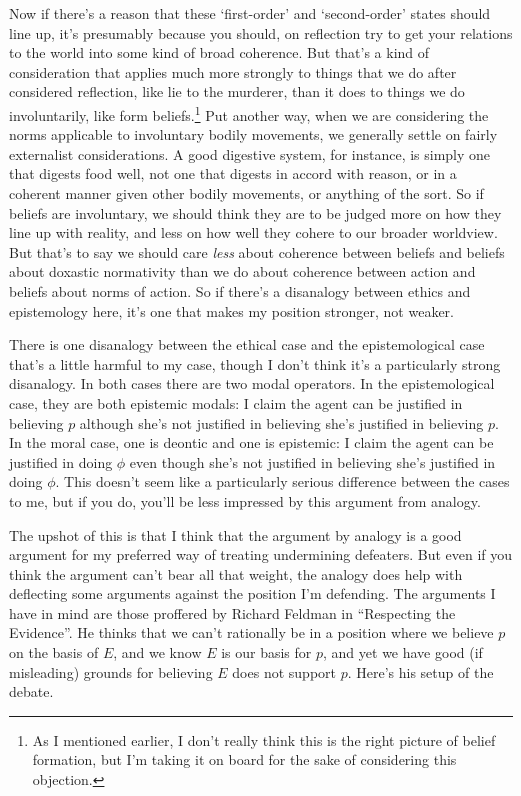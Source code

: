 Now if there's a reason that these `first-order' and `second-order' states should line up, it's presumably because you should, on reflection try to get your relations to the world into some kind of broad coherence. But that's a kind of consideration that applies much more strongly to things that we do after considered reflection, like lie to the murderer, than it does to things we do involuntarily, like form beliefs.\footnote{As I mentioned earlier, I don't really think this is the right picture of belief formation, but I'm taking it on board for the sake of considering this objection.} Put another way, when we are considering the norms applicable to involuntary bodily movements, we generally settle on fairly externalist considerations. A good digestive system, for instance, is simply one that digests food well, not one that digests in accord with reason, or in a coherent manner given other bodily movements, or anything of the sort. So if beliefs are involuntary, we should think they are to be judged more on how they line up with reality, and less on how well they cohere to our broader worldview. But that's to say we should care \textit{less} about coherence between beliefs and beliefs about doxastic normativity than we do about coherence between action and beliefs about norms of action. So if there's a disanalogy between ethics and epistemology here, it's one that makes my position stronger, not weaker.

There is one disanalogy between the ethical case and the epistemological case that's a little harmful to my case, though I don't think it's a particularly strong disanalogy. In both cases there are two modal operators. In the epistemological case, they are both epistemic modals: I claim the agent can be justified in believing \(p\) although she's not justified in believing she's justified in believing \(p\). In the moral case, one is deontic and one is epistemic: I claim the agent can be justified in doing \(\phi\) even though she's not justified in believing she's justified in doing \(\phi\). This doesn't seem like a particularly serious difference between the cases to me, but if you do, you'll be less impressed by this argument from analogy.

The upshot of this is that I think that the argument by analogy is a good argument for my preferred way of treating undermining defeaters. But even if you think the argument can't bear all that weight, the analogy does help with deflecting some arguments against the position I'm defending. The arguments I have in mind are those proffered by Richard Feldman in ``Respecting the Evidence''. He thinks that we can't rationally be in a position where we believe \(p\) on the basis of \(E\), and we know \(E\) is our basis for \(p\), and yet we have good (if misleading) grounds for believing \(E\) does not support \(p\). Here's his setup of the debate.

